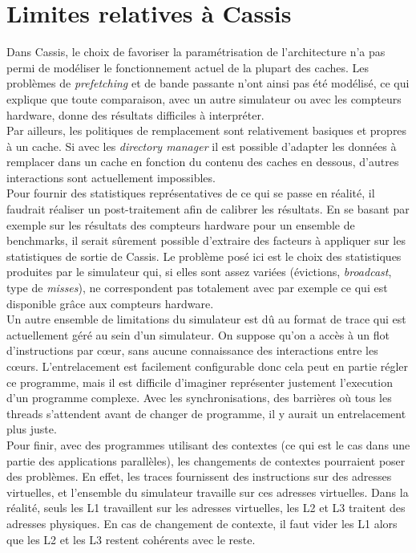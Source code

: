 \section{Limites relatives à \textsf{Cassis}}

Dans \textsf{Cassis}, le choix de favoriser la paramétrisation de l'architecture n'a pas permi de modéliser le fonctionnement actuel de la plupart des caches. Les problèmes de \emph{prefetching} et de bande passante n'ont ainsi pas été modélisé, ce qui explique que toute comparaison, avec un autre simulateur ou avec les compteurs hardware, donne des résultats difficiles à interpréter. \\

Par ailleurs, les politiques de remplacement sont relativement basiques et propres à un cache. Si avec les \emph{directory manager} il est possible d'adapter les données à remplacer dans un cache en fonction du contenu des caches en dessous, d'autres interactions sont actuellement impossibles. \\

Pour fournir des statistiques représentatives de ce qui se passe en réalité, il faudrait réaliser un post-traitement afin de calibrer les résultats. En se basant par exemple sur les résultats des compteurs hardware pour un ensemble de benchmarks, il serait sûrement possible d'extraire des facteurs à appliquer sur les statistiques de sortie de \textsf{Cassis}. Le problème posé ici est le choix des statistiques produites par le simulateur qui, si elles sont assez variées (évictions, \emph{broadcast}, type de \emph{misses}), ne correspondent pas totalement avec par exemple ce qui est disponible grâce aux compteurs hardware. \\

Un autre ensemble de limitations du simulateur est dû au format de trace qui est actuellement géré au sein d'un simulateur. On suppose qu'on a accès à un flot d'instructions par c{\oe}ur, sans aucune connaissance des interactions entre les c{\oe}urs. L'entrelacement est facilement configurable donc cela peut en partie régler ce programme, mais il est difficile d'imaginer représenter justement l'execution d'un programme complexe. Avec les synchronisations, des barrières où tous les threads s'attendent avant de changer de programme, il y aurait un entrelacement plus juste. \\

Pour finir, avec des programmes utilisant des contextes (ce qui est le cas dans une partie des applications parallèles), les changements de contextes pourraient poser des problèmes. En effet, les traces fournissent des instructions sur des adresses virtuelles, et l'ensemble du simulateur travaille sur ces adresses virtuelles. Dans la réalité, seuls les L1 travaillent sur les adresses virtuelles, les L2 et L3 traitent des adresses physiques. En cas de changement de contexte, il faut vider les L1 alors que les L2 et les L3 restent cohérents avec le reste.

